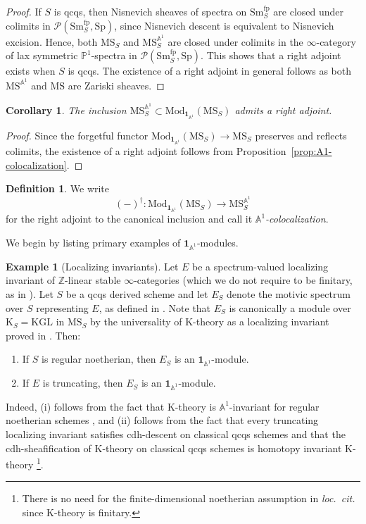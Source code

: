 \documentclass{amsart}
\numberwithin{equation}{section}
\theoremstyle{plain}
\newtheorem{corollary}[equation]{Corollary}
\theoremstyle{definition}
\newtheorem{definition}[equation]{Definition}
\newtheorem{example}[equation]{Example}
\let\scr=\mathcal
\let\bb=\mathbb
\def\Z{\bb Z}
\def\A{\bb A}
\def\P{\bb P}
\def\1{\mathbf 1}
\def\ph{\mathord-}
\let\cat=\mathrm
\def\KGL{\mathrm{KGL}}
\def\K{\mathrm{K}{}}
\def\Mod{\cat{M}\mathrm{od}{}}
\def\Sm{{\cat{S}\mathrm{m}}}
\def\MS{\mathrm{MS}}
\def\Sp{\mathrm{Sp}}
\def\fp{\mathrm{fp}}
\begin{document}
\begin{proof}
	If $S$ is qcqs, then Nisnevich sheaves of spectra on $\Sm_S^\fp$ are closed under colimits in $\scr P(\Sm_S^\fp,\Sp)$, since Nisnevich descent is equivalent to Nisnevich excision. Hence, both $\MS_S$ and $\MS^{\A^1}_S$ are closed under colimits in the $\infty$-category of lax symmetric $\P^1$-spectra in $\scr P(\Sm_S^\fp,\Sp)$. This shows that a right adjoint exists when $S$ is qcqs. The existence of a right adjoint in general follows as both $\MS^{\A^1}$ and $\MS$ are Zariski sheaves.
\end{proof}

\begin{corollary}\label{cor:A1-colocalization}
The inclusion $\MS^{\A^1}_S\subset\Mod_{\1_{\A^1}}(\MS_S)$ admits a right adjoint.
\end{corollary}

\begin{proof}
Since the forgetful functor $\Mod_{\1_{\A^1}}(\MS_S)\to\MS_S$ preserves and reflects colimits, the existence of a right adjoint follows from Proposition~\ref{prop:A1-colocalization}.
\end{proof}

\begin{definition}\label{def:coloc}
We write
\[
	(\ph)^\dagger \colon \Mod_{\1_{\A^1}}(\MS_S) \to \MS_S^{\A^1}
\]
for the right adjoint to the canonical inclusion and call it \textit{$\A^1$-colocalization}.
\end{definition}

We begin by listing primary examples of $\1_{\A^1}$-modules.

\begin{example}[Localizing invariants]
	\label{ex:locinv}
Let $E$ be a spectrum-valued localizing invariant of $\Z$-linear stable $\infty$-categories (which we do not require to be finitary, as in \cite[Definition 1.2]{LT}). Let $S$ be a qcqs derived scheme and let $E_S$ denote the motivic spectrum over $S$ representing $E$, as defined in \cite[Remark 5.2.4]{AnnalaIwasa2}.
Note that $E_S$ is canonically a module over $\K_S=\KGL$ in $\MS_S$ by the universality of $\K$-theory as a localizing invariant proved in \cite{blumberg2013universal}. Then:
\begin{enumerate}
\item If $S$ is regular noetherian, then $E_S$ is an $\1_{\A^1}$-module.
\item If $E$ is truncating, then $E_S$ is an $\1_{\A^1}$-module.
\end{enumerate}
Indeed, (i) follows from the fact that $\K$-theory is $\A^1$-invariant for regular noetherian schemes \cite[Proposition~6.8]{TT}, and (ii) follows from the fact that every truncating localizing invariant satisfies cdh-descent on classical qcqs schemes \cite[Theorem~A.2]{LT} and that the cdh-sheafification of $\K$-theory on classical qcqs schemes is homotopy invariant $\K$-theory \cite[Theorem~6.3]{KST}\footnote{There is no need for the finite-dimensional noetherian assumption in \emph{loc.\ cit.} since $\K$-theory is finitary.}.
\end{example}
\end{document}
